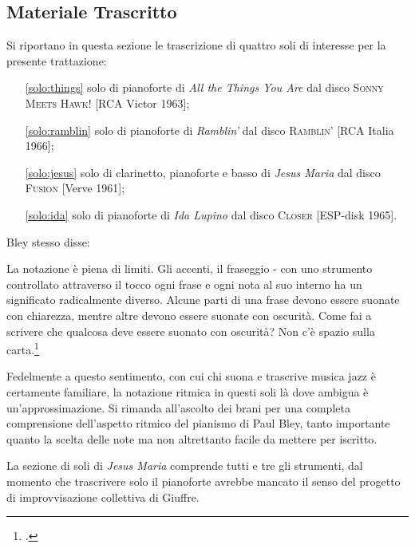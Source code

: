 \begin{appendices}
\chapter{Materiale Trascritto}
Si riportano in questa sezione le trascrizione di quattro soli di interesse per la presente trattazione:
\begin{enumerate}
	\item[\ref{solo:things}] solo di pianoforte di \textit{All the Things You Are} dal disco \textsc{Sonny Meets Hawk!} [RCA Victor 1963];
	\item[\ref{solo:ramblin}] solo di pianoforte di \textit{Ramblin'} dal disco \textsc{Ramblin'} [RCA Italia 1966];
	\item[\ref{solo:jesus}] solo di clarinetto, pianoforte e basso di \textit{Jesus Maria} dal disco \textsc{Fusion} [Verve 1961];
	\item[\ref{solo:ida}] solo di pianoforte di \textit{Ida Lupino} dal disco \textsc{Closer} [ESP-disk 1965].
\end{enumerate}
Bley stesso disse:
\begin{fquote}
	La notazione è piena di limiti. Gli accenti, il fraseggio - con uno strumento controllato attraverso il tocco ogni frase e ogni nota al suo interno ha un significato radicalmente diverso. Alcune parti di una frase devono essere suonate con chiarezza, mentre altre devono essere suonate con oscurità. Come fai a scrivere che qualcosa deve essere suonato con oscurità? Non c'è spazio sulla carta.\footcite[25]{stopping}
\end{fquote}
Fedelmente a questo sentimento, con cui chi suona e trascrive musica jazz è certamente familiare, la notazione ritmica in questi soli là dove ambigua è un'approssimazione. Si rimanda all'ascolto dei brani per una completa comprensione dell'aspetto ritmico del pianismo di Paul Bley, tanto importante quanto la scelta delle note ma non altrettanto facile da mettere per iscritto.\par
La sezione di soli di \textit{Jesus Maria} comprende tutti e tre gli strumenti, dal momento che trascrivere solo il pianoforte avrebbe mancato il senso del progetto di improvvisazione collettiva di Giuffre. 


\end{appendices}
